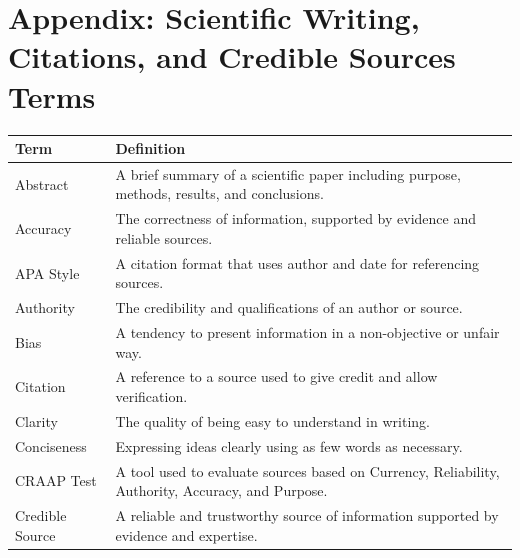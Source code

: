 \documentclass[
  letterpaper,
  DIV=11,
  numbers=noendperiod]{scrreprt}
\newcounter{none} %
\begin{document}
\section*{\texorpdfstring{\textbf{Appendix: Scientific Writing,
Citations, and Credible Sources
Terms}}{Appendix: Scientific Writing, Citations, and Credible Sources Terms}}\label{appendix-scientific-writing-citations-and-credible-sources-terms}


{\def\LTcaptype{none} %
\begin{longtable}[]{@{}
  >{\raggedright\arraybackslash}p{}
  >{\raggedright\arraybackslash}p{}@{}}
\toprule\noalign{}
\begin{minipage}[b]{\linewidth}\raggedright
Term
\end{minipage} & \begin{minipage}[b]{\linewidth}\raggedright
Definition
\end{minipage} \\
\midrule\noalign{}
\endhead
\bottomrule\noalign{}
\endlastfoot
Abstract & A brief summary of a scientific paper including purpose,
methods, results, and conclusions. \\
Accuracy & The correctness of information, supported by evidence and
reliable sources. \\
APA Style & A citation format that uses author and date for referencing
sources. \\
Authority & The credibility and qualifications of an author or
source. \\
Bias & A tendency to present information in a non-objective or unfair
way. \\
Citation & A reference to a source used to give credit and allow
verification. \\
Clarity & The quality of being easy to understand in writing. \\
Conciseness & Expressing ideas clearly using as few words as
necessary. \\
CRAAP Test & A tool used to evaluate sources based on Currency,
Reliability, Authority, Accuracy, and Purpose. \\
Credible Source & A reliable and trustworthy source of information
supported by evidence and expertise. \\

\end{longtable}}
\end{document}
